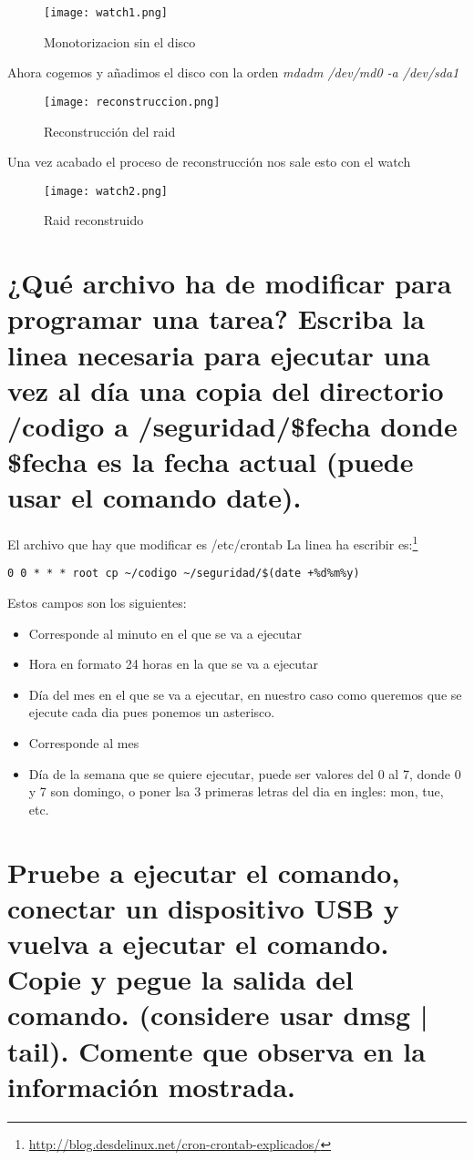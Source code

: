 \begin{figure}[H] 
\centering
\texttt{[image: watch1.png]}  
\label{figura3:}
\caption{Monotorizacion sin el disco}
\end{figure}
Ahora cogemos y añadimos el disco con la orden
\textit{mdadm /dev/md0 -a /dev/sda1}
\begin{figure}[H] 
\centering
\texttt{[image: reconstruccion.png]}  
\label{figura4:}
\caption{Reconstrucción del raid}
\end{figure}
Una vez acabado el proceso de reconstrucción nos sale esto con el watch
\begin{figure}[H] 
\centering
\texttt{[image: watch2.png]}  
\label{figura5:}
\caption{Raid reconstruido}
\end{figure}

\section{¿Qué archivo ha de modificar para programar una tarea? Escriba la linea necesaria para ejecutar una vez al día una copia del directorio /codigo a /seguridad/\$fecha donde \$fecha es la fecha actual (puede usar el comando date).}
El archivo que hay que modificar es /etc/crontab
La linea ha escribir es:\footnote{\url{http://blog.desdelinux.net/cron-crontab-explicados/}}
\begin{verbatim}
0 0 * * * root cp ~/codigo ~/seguridad/$(date +%d%m%y)
\end{verbatim}
Estos campos son los siguientes:
\begin{itemize}
\item Corresponde al minuto en el que se va a ejecutar
\item Hora en formato 24 horas en la que se va a ejecutar
\item Día del mes en el que se va a ejecutar, en nuestro caso como queremos que se ejecute cada dia pues ponemos un asterisco.
\item Corresponde al mes
\item Día de la semana que se quiere ejecutar, puede ser valores del 0 al 7, donde 0 y 7 son domingo, o poner lsa 3 primeras letras del dia en ingles: mon, tue, etc.
\end{itemize}
\section{Pruebe a ejecutar el comando, conectar un dispositivo USB y vuelva a ejecutar el comando. Copie y pegue la salida del comando. (considere usar dmsg | tail). Comente que observa en la información mostrada.}

